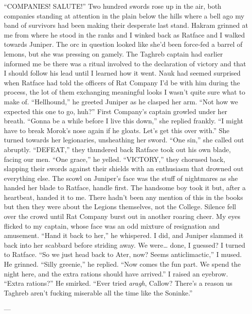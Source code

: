 \documentclass[12pt, openany]{book}
\begin{document}
“COMPANIES! SALUTE!”
Two hundred swords rose up in the air, both companies standing at attention in the plain below the hills where a bell ago my band of survivors had been making their desperate last stand. Hakram grinned at me from where he stood in the ranks and I winked back as Ratface and I walked towards Juniper. The orc in question looked like she’d been force-fed a barrel of lemons, but she was pressing on gamely. The Taghreb captain had earlier informed me be there was a ritual involved to the declaration of victory and that I should follow his lead until I learned how it went. Nauk had seemed surprised when Ratface had told the officers of Rat Company I’d be with him during the process, the lot of them exchanging meaningful looks I wasn’t quite sure what to make of.
“Hellhound,” he greeted Juniper as he clasped her arm. “Not how we expected this one to go, huh?”
First Company’s captain growled under her breath.
“Gonna be a while before I live this down,” she replied frankly. “I might have to break Morok’s nose again if he gloats. Let’s get this over with.”
She turned towards her legionaries, unsheathing her sword.
“One sin,” she called out abruptly.
“DEFEAT,” they thundered back
Ratface took out his own blade, facing our men.
“One grace,” he yelled.
“VICTORY,” they chorused back, slapping their swords against their shields with an enthusiasm that drowned out everything else.
The scowl on Juniper’s face was the stuff of nightmares as she handed her blade to Ratface, handle first. The handsome boy took it but, after a heartbeat, handed it to me. There hadn’t been any mention of this in the books but then they were about the Legions themselves, not the College. Silence fell over the crowd until Rat Company burst out in another roaring cheer. My eyes flicked to my captain, whose face was an odd mixture of resignation and amusement.
“Hand it back to her,” he whispered.
I did, and Juniper slammed it back into her scabbard before striding away. We were… done, I guessed? I turned to Ratface.
“So we just head back to Ater, now? Seems anticlimactic,” I mused.
He grinned. “Silly greenie,” he replied. “Now comes the fun part. We spend the night here, and the extra rations should have arrived.”
I raised an eyebrow. “Extra rations?”
He smirked. “Ever tried \textit{aragh}, Callow? There’s a reason us Taghreb aren’t fucking miserable all the time like the Soninke.”

—
\end{document}
